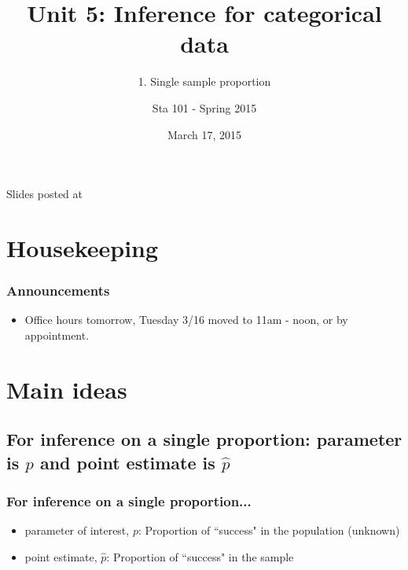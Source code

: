 \documentclass[11pt,containsverbatim,handout,xcolor=xelatex,dvipsnames,table]{beamer}
\title{Unit 5: Inference for categorical data}
\subtitle{1. Single sample proportion}
\author{Sta 101 - Spring 2015}
\date{March 17, 2015}
\institute{Duke University, Department of Statistical Science}
\begin{document}


\begin{frame}[plain]

\titlepage
\vfill
{\scriptsize {} \hfill Slides posted at  \webLink{\CourseSite}{\CourseSite}}
\addtocounter{framenumber}{-1} 

\end{frame}


\section{Housekeeping}


\begin{frame}
\frametitle{Announcements}

\begin{itemize}

\item Office hours tomorrow, Tuesday 3/16 moved to 11am - noon, or by appointment.

\end{itemize}

\end{frame}


\section{Main ideas}


\subsection{For inference on a single proportion: parameter is $p$ and point estimate is $\hat{p}$}
\label{mi1}


\begin{frame}
\frametitle{For inference on a single proportion...}

\begin{itemize}

\item parameter of interest, $p$: Proportion of ``success" in the population (unknown)

\item point estimate, $\hat{p}$: Proportion of ``success" in the sample

\end{itemize}

\end{frame}
\end{document}
